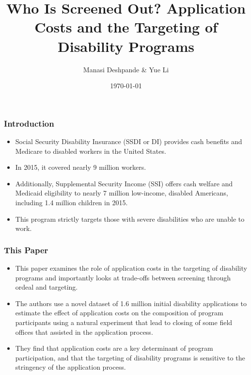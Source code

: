 \documentclass{beamer}
\begin{document}
\title{Who Is Screened Out? Application Costs and the Targeting of Disability Programs}
\author{Manasi Deshpande \& Yue Li}
\date{\today}

\frame{\titlepage}


\begin{frame}
    \frametitle{Introduction}
    \begin{itemize}
        \item Social Security Disability Insurance (SSDI or DI) provides cash benefits and Medicare to disabled workers in the United States. 
        \item In 2015, it covered nearly 9 million workers.
        \item  Additionally, Supplemental Security Income (SSI) offers cash welfare and Medicaid eligibility to nearly 7 million low-income, disabled Americans, including 1.4 million children in 2015.
        \item This program strictly targets those with severe disabilities who are unable to work.
    \end{itemize}
\end{frame}

\begin{frame}
    \frametitle{This Paper}
    \begin{itemize}
        \item This paper examines the role of application costs in the targeting of disability programs and importantly looks at trade-offs between screening through ordeal and targeting.
        \item The authors use a novel dataset of 1.6 million initial disability applications to estimate the effect of application costs on the composition of program participants using a natural experiment that lead to closing of some field offices that assisted in the application process. 
        \item They find that application costs are a key determinant of program participation, and that the targeting of disability programs is sensitive to the stringency of the application process.
        
    \end{itemize}
\end{frame}
\end{document}
